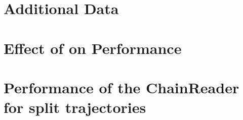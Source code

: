 \documentclass[review]{elsarticle}
\begin{document}


\clearpage

\appendix
\section{Additional Data}


\section{Effect of \Rcompcomm on Performance}


\section{Performance of the ChainReader for split trajectories}



%
\end{document}
